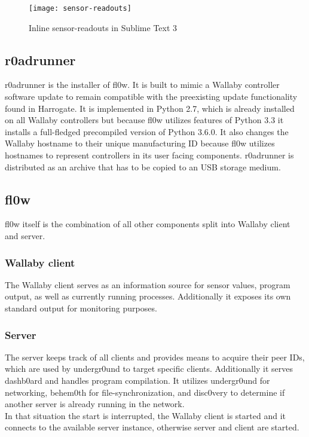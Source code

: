 \documentclass[conference]{IEEEtran}
\begin{document}
\begin{figure}[H]
\centering
\texttt{[image: sensor-readouts]}
\caption{Inline sensor-readouts in Sublime Text 3\cite{Sublime Text 3:Sublime HQ}}
\label{fig:inline_sensor_readouts}
\end{figure}


\subsection{r0adrunner}
r0adrunner is the installer of fl0w\cite{fl0w:Philip Trauner}. It is built to mimic a Wallaby\cite{Wallaby Controller:KIPR} controller software update to remain compatible with the preexisting update functionality found in Harrogate\cite{Harrogate:KIPR}. It is implemented in Python\cite{Python:Python Foundation} 2.7, which is already installed on all Wallaby\cite{Wallaby Controller:KIPR} controllers but because fl0w\cite{fl0w:Philip Trauner} utilizes features of Python\cite{Python:Python Foundation} 3.3 it installs a full-fledged precompiled version of Python\cite{Python:Python Foundation} 3.6.0. It also changes the Wallaby\cite{Wallaby Controller:KIPR} hostname to their unique manufacturing ID because fl0w\cite{fl0w:Philip Trauner} utilizes hostnames to represent controllers in its user facing components. r0adrunner is distributed as an archive that has to be copied to an USB storage medium.

\subsection{fl0w}
fl0w\cite{fl0w:Philip Trauner} itself is the combination of all other components split into Wallaby\cite{Wallaby Controller:KIPR} client and server.\\

\subsubsection{Wallaby client}
The Wallaby\cite{Wallaby Controller:KIPR} client serves as an information source for sensor values, program output, as well as currently running processes. Additionally it exposes its own standard output for monitoring purposes.\\

\subsubsection{Server}
The server keeps track of all clients and provides means to acquire their peer IDs, which are used by undergr0und to target specific clients. Additionally it serves dashb0ard\cite{dashb0ard:Sebastian Schaffler} and handles program compilation. It utilizes undergr0und for networking, behem0th for file-synchronization, and disc0very to determine if another server is already running in the network. \\
In that situation the start is interrupted, the Wallaby\cite{Wallaby Controller:KIPR} client is started and it connects to the available server instance, otherwise server and client are started. \\
\end{document}
